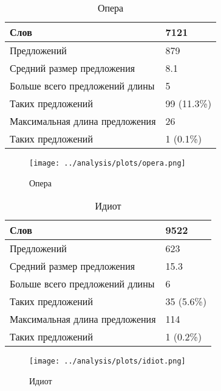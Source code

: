 \documentclass{kursa4}
\begin{document}
    \pagebreak
    \begin{samepage} %
      \begin{table}
        \centering     
        \tablehead{} %
        \begin{tabular}{|m{10cm}|m{3cm}|}
          \hline
          Слов & 7121\\\hline
          Предложений & 879\\\hline
          Средний размер предложения & 8.1\\\hline
          Больше всего предложений длины & 5\\\hline
          Таких предложений & 99 (11.3\%)\\\hline
          Максимальная длина предложения & 26\\\hline
          Таких предложений & 1 (0.1\%)\\\hline
        \end{tabular}
        \caption{Опера}
      \end{table} 
      
      \begin{figure}[htbp] \centering
        \texttt{[image: ../analysis/plots/opera.png]}
        \caption{Опера}
      \end{figure}
    \end{samepage}


      \begin{table}
        \centering
        \tablehead{}
        \begin{tabular}{|m{10cm}|m{3cm}|}
          \hline
          Слов & 9522\\\hline
          Предложений & 623\\\hline
          Средний размер предложения & 15.3\\\hline
          Больше всего предложений длины & 6\\\hline
          Таких предложений & 35 (5.6\%)\\\hline
          Максимальная длина предложения & 114\\\hline
          Таких предложений & 1 (0.2\%)\\\hline
        \end{tabular}
        \caption{Идиот}
      \end{table}

      \begin{figure}[htbp] \centering
        \texttt{[image: ../analysis/plots/idiot.png]}
        \caption{Идиот}
      \end{figure}
\end{document}
